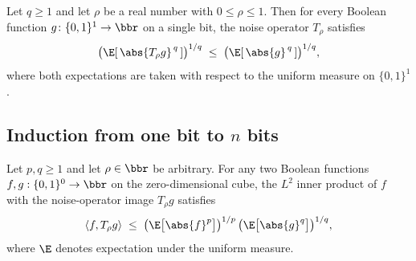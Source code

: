 \begin{lemma}
\label{BooleanAnalysis.Hypercontractivity.noise_Lp_contraction_one_bit}
\leanok
{}
Let $q \ge 1$ and let $\rho$ be a real number with $0 \le \rho \le 1$. Then for every
Boolean function $g \colon \{0,1\}^1 \to \bbr$ on a single bit, the noise operator
$T_\rho$ satisfies
\[
  \bigl(\E\!\left[\,\abs{T_\rho g}^{\,q}\,\right]\bigr)^{1/q}
  \;\le\;
  \bigl(\E\!\left[\,\abs{g}^{\,q}\,\right]\bigr)^{1/q},
\]
where both expectations are taken with respect to the uniform measure on $\{0,1\}^1$.
\end{lemma}

\subsection{Induction from one bit to $n$ bits}

\begin{lemma}
\label{BooleanAnalysis.Hypercontractivity.two_func_hyp_zero}
\leanok
{}
Let $p, q \ge 1$ and let $\rho \in \bbr$ be arbitrary. For any two Boolean functions $f,
g : \{0,1\}^0 \to \bbr$ on the zero-dimensional cube, the $L^2$ inner product of $f$
with the noise-operator image $T_\rho g$ satisfies
\[
\langle f, T_\rho g\rangle \;\le\;
\bigl(\E\bigl[\abs{f}^p\bigr]\bigr)^{1/p}\,\bigl(\E\bigl[\abs{g}^q\bigr]\bigr)^{1/q},
\]
where $\E$ denotes expectation under the uniform measure.
\end{lemma}

